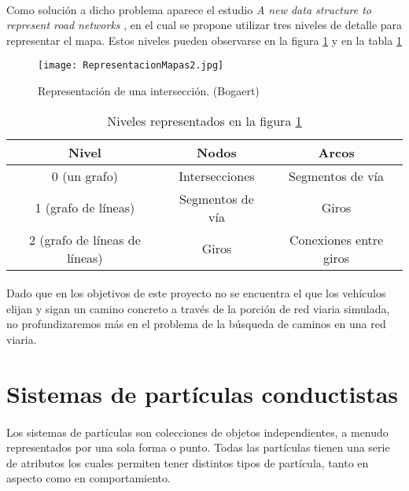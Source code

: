 	\paragraph{}
	Como solución a dicho problema aparece el estudio \emph{A new data structure to represent road networks} \cite{Bogaert}, en el cual se propone utilizar tres niveles de detalle para representar el mapa. Estos niveles pueden observarse en la figura \ref{fig:RepresentacionMapas2} y en la tabla \ref{table:TablaNiveles}
	
	\begin{figure}[ht]
		\centering
			\texttt{[image: RepresentacionMapas2.jpg]}
		\caption{Representación de una intersección. (Bogaert) \cite{Bogaert}}
		\label{fig:RepresentacionMapas2}
	\end{figure}
	
	\begin{table}[ht]
		\begin{tabular}{|c|c|c|}
			\hline
			Nivel & Nodos & Arcos \\
			\hline
			\hline
			0 (un grafo) & Intersecciones & Segmentos de vía \\
			\hline
			1 (grafo de líneas) & Segmentos de vía & Giros \\
			\hline
			2 (grafo de líneas de líneas) & Giros & Conexiones entre giros \\
			\hline
		\end{tabular}

	\caption{Niveles representados en la figura \ref{fig:RepresentacionMapas2}}
	\label{table:TablaNiveles}
	\end{table}
	
	\paragraph{}
	Dado que en los objetivos de este proyecto no se encuentra el que los vehículos elijan y sigan un camino concreto a través de la porción de red viaria simulada, no profundizaremos más en el problema de la búsqueda de caminos en una red viaria.
	
\section{Sistemas de partículas conductistas}
	
	\paragraph{}
	Los sistemas de partículas son colecciones de objetos independientes, a menudo representados por una sola forma o punto. Todas las partículas tienen una serie de atributos los cuales permiten tener distintos tipos de partícula, tanto en aspecto como en comportamiento.
	
